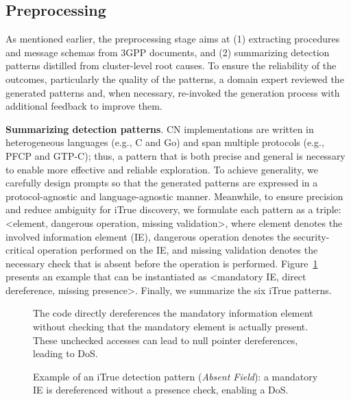 \subsection{Preprocessing}
\label{sec:preprocessing}
As mentioned earlier, the preprocessing stage aims at (1) extracting procedures and message schemas from 3GPP documents, and (2) summarizing detection patterns distilled from cluster-level root causes. To ensure the reliability of the outcomes, particularly the quality of the patterns, a domain expert reviewed the generated patterns and, when necessary, re-invoked the generation process with additional feedback to improve them.

\vspace{2pt}\noindent\textbf{Summarizing detection patterns}. 
CN implementations are written in heterogeneous languages (e.g., C and Go) and span multiple protocols (e.g., PFCP and GTP-C); thus, a pattern that is both precise and general is necessary to enable more effective and reliable exploration.
To achieve generality, we carefully design prompts so that the generated patterns are expressed in a protocol-agnostic and language-agnostic manner.
Meanwhile, to ensure precision and reduce ambiguity for iTrue discovery, we formulate each pattern as a triple: <element, dangerous operation, missing validation>, where element denotes the involved information element (IE), dangerous operation denotes the security-critical operation performed on the IE, and missing validation denotes the necessary check that is absent before the operation is performed. Figure~\ref{fig:pattern} presents an example that can be instantiated as <mandatory IE, direct dereference, missing presence>. 
Finally, we summarize the six iTrue patterns.

\begin{figure}[t]
\centering
\begin{tcolorbox}[
  colback=boxbg,
  colframe=boxframe,
  coltitle=black,
  title=Absent Field Pattern,
  width=\linewidth,
  boxrule=0.6pt,
  arc=2mm,
  left=1.2mm,right=1.2mm,top=1.0mm,bottom=1.0mm
]
The code directly dereferences the mandatory information element without
\textcolor{checkblue}{checking that the mandatory element is actually present.}
\textcolor{riskorange}{These unchecked accesses can lead to null pointer dereferences, leading to DoS.}
\end{tcolorbox}
\caption{Example of an iTrue detection pattern (\textit{Absent Field}): a mandatory IE is dereferenced without a presence check, enabling a DoS.}
\label{fig:pattern}
\end{figure}



